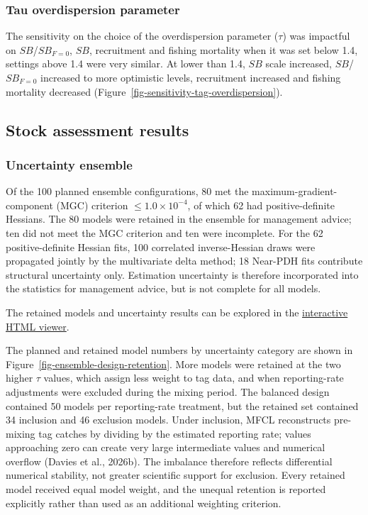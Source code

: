\documentclass[
  english,
  a4paper,
  a4paper,
  11pt]{SCreport}
\begin{document}
\subsubsection{Tau overdispersion parameter}\label{sec-oneoff-tau}

The sensitivity on the choice of the overdispersion parameter (\(\tau\))
was impactful on \(SB\)/\(SB_{F=0}\), \(SB\), recruitment and fishing
mortality when it was set below 1.4, settings above 1.4 were very
similar. At lower than 1.4, \(SB\) scale increased, \(SB\)/\(SB_{F=0}\)
increased to more optimistic levels, recruitment increased and fishing
mortality decreased (Figure~\ref{fig-sensitivity-tag-overdispersion}).

\subsection{Stock assessment results}\label{sec-stock-assess-results}

\subsubsection{Uncertainty
ensemble}\label{sec-structural-uncertainty-analysis}

Of the 100 planned ensemble configurations, 80 met the
maximum-gradient-component (MGC) criterion \(\leq 1.0 \times 10^{-4}\),
of which 62 had positive-definite Hessians. The 80 models were retained
in the ensemble for management advice; ten did not meet the MGC
criterion and ten were incomplete. For the 62 positive-definite Hessian
fits, 100 correlated inverse-Hessian draws were propagated jointly by
the multivariate delta method; 18 Near-PDH fits contribute structural
uncertainty only. Estimation uncertainty is therefore incorporated into
the statistics for management advice, but is not complete for all
models.

The retained models and uncertainty results can be explored in the
\href{https://pacificcommunity.github.io/ofp-sam-bet-2026-ensemble/bet-2026-ensemble-interactive-viewer.html}{interactive
HTML viewer}.

The planned and retained model numbers by uncertainty category are shown
in Figure~\ref{fig-ensemble-design-retention}. More models were retained
at the two higher \(\tau\) values, which assign less weight to tag data,
and when reporting-rate adjustments were excluded during the mixing
period. The balanced design contained 50 models per reporting-rate
treatment, but the retained set contained 34 inclusion and 46 exclusion
models. Under inclusion, MFCL reconstructs pre-mixing tag catches by
dividing by the estimated reporting rate; values approaching zero can
create very large intermediate values and numerical overflow (Davies et
al., 2026b). The imbalance therefore reflects differential numerical
stability, not greater scientific support for exclusion. Every retained
model received equal model weight, and the unequal retention is reported
explicitly rather than used as an additional weighting criterion.
\end{document}

